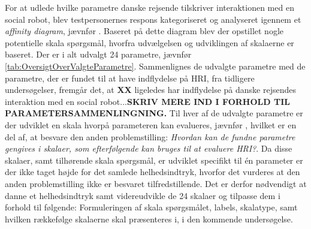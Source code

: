 \noindent
%
For at udlede hvilke parametre danske rejsende tilskriver interaktionen med en social robot, blev testpersonernes respons kategoriseret og analyseret igennem et \textit{affinity diagram}, jævnfør . Baseret på dette diagram blev der opstillet nogle potentielle skala spørgsmål, hvorfra udvælgelsen og udviklingen af skalaerne er baseret. Der er i alt udvalgt 24 parametre, jævnfør \autoref{tab:OversigtOverValgteParametre}. Sammenlignes de udvalgte parametre med de parametre, der er fundet til at have indflydelse på HRI, fra tidligere undersøgelser, fremgår det, at \textbf{XX} ligeledes har indflydelse på danske rejsendes interaktion med en social robot...\textbf{SKRIV MERE IND I FORHOLD TIL PARAMETERSAMMENLINGNING.}\blankline
%
Til hver af de udvalgte parametre er der udviklet en skala hvorpå parameteren kan evalueres, jævnfør , hvilket er en del af, at besvare den anden problemstilling: \textit{Hvordan kan de fundne parametre gengives i skalaer, som efterfølgende kan bruges til at evaluere HRI?}. Da disse skalaer, samt tilhørende skala spørgsmål, er udviklet specifikt til én parameter er der ikke taget højde for det samlede helhedsindtryk, hvorfor det vurderes at den anden problemstilling ikke er besvaret tilfredstillende. Det er derfor nødvendigt at danne et helhedsindtryk samt videreudvikle de 24 skalaer og tilpasse dem i forhold til følgende: Formuleringen af skala spørgsmålet, labels, skalatype, samt hvilken rækkefølge skalaerne skal præsenteres i, i den kommende undersøgelse.    





